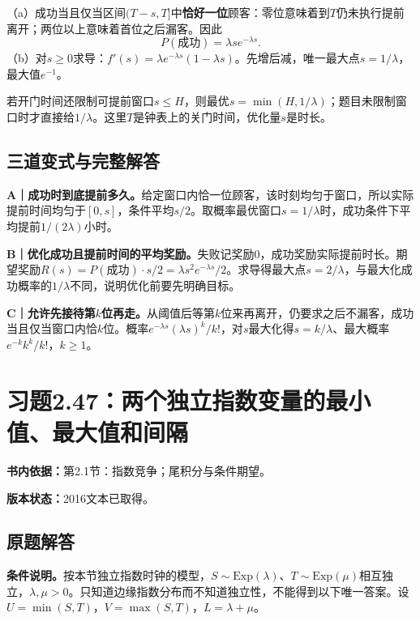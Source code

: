 \documentclass[
  11pt,
  a4paper,
  UTF8,fontset=fandol]{ctexart}
\let\OldSection\section
\renewcommand{\section}{\Needspace{7\baselineskip}\OldSection}
\let\OldSubsection\subsection
\renewcommand{\subsection}{\Needspace{5\baselineskip}\OldSubsection}
\begin{document}
（a）成功当且仅当区间\((T-s,T]\)中\textbf{恰好一位}顾客：零位意味着到\(T\)仍未执行提前离开；两位以上意味着首位之后漏客。因此
\[\boxed{P(\text{成功})=\lambda s e^{-\lambda s}.}\]
（b）对\(s\ge0\)求导：\(f'(s)=\lambda e^{-\lambda s}(1-\lambda s)\)。先增后减，唯一最大点\(s=1/\lambda\)，最大值\(\boxed{e^{-1}}\)。

若开门时间还限制可提前窗口\(s\le H\)，则最优\(s=\min(H,1/\lambda)\)；题目未限制窗口时才直接给\(1/\lambda\)。这里\(T\)是钟表上的关门时间，优化量\(s\)是时长。

\subsection{三道变式与完整解答}\label{ux4e09ux9053ux53d8ux5f0fux4e0eux5b8cux6574ux89e3ux7b54-45}

\textbf{A｜成功时到底提前多久。}给定窗口内恰一位顾客，该时刻均匀于窗口，所以实际提前时间均匀于\([0,s]\)，条件平均\(s/2\)。取概率最优窗口\(s=1/\lambda\)时，成功条件下平均提前\(1/(2\lambda)\)小时。

\textbf{B｜优化成功且提前时间的平均奖励。}失败记奖励0，成功奖励实际提前时长。期望奖励\(R(s)=P(\text{成功})\cdot s/2=\lambda s^2e^{-\lambda s}/2\)。求导得最大点\(s=2/\lambda\)，与最大化成功概率的\(1/\lambda\)不同，说明优化前要先明确目标。

\textbf{C｜允许先接待第\(k\)位再走。}从阈值后等第\(k\)位来再离开，仍要求之后不漏客，成功当且仅当窗口内恰\(k\)位。概率\(e^{-\lambda s}(\lambda s)^k/k!\)，对\(s\)最大化得\(s=k/\lambda\)、最大概率\(e^{-k}k^k/k!\)，\(k\ge1\)。

\newpage

\section{习题2.47：两个独立指数变量的最小值、最大值和间隔}\label{ux4e60ux98982.47ux4e24ux4e2aux72ecux7acbux6307ux6570ux53d8ux91cfux7684ux6700ux5c0fux503cux6700ux5927ux503cux548cux95f4ux9694}

\textbf{书内依据：}第2.1节：指数竞争；尾积分与条件期望。

\textbf{版本状态：}2016文本已取得。

\subsection{原题解答}\label{ux539fux9898ux89e3ux7b54-46}

\textbf{条件说明。}按本节独立指数时钟的模型，\(S\sim\mathrm{Exp}(\lambda)\)、\(T\sim\mathrm{Exp}(\mu)\)相互独立，\(\lambda,\mu>0\)。只知道边缘指数分布而不知道独立性，不能得到以下唯一答案。设\(U=\min(S,T)\)，\(V=\max(S,T)\)，\(L=\lambda+\mu\)。
\end{document}
